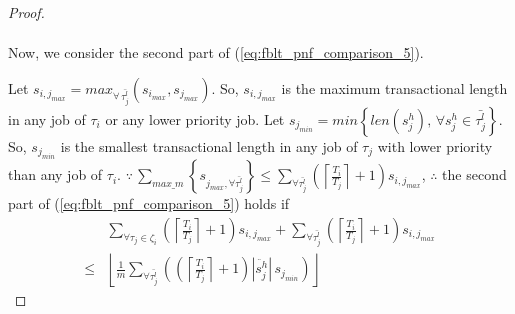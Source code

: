 \documentclass[conference,letterpaper]{IEEEtran}
\begin{document}
\begin{proof}
\begin{eqnarray}
\end{eqnarray}
%

%
Now, we consider the second part of (\ref{eq:fblt_pnf_comparison_5}). 
%

%
Let $s_{i,j_{max}}=max_{\forall\,\bar{\tau_{j}^{l}}}(s_{i_{max}},s_{j_{max}})$.
So, $s_{i,j_{max}}$ is the maximum transactional length in any job
of $\tau_{i}$ or any lower priority job. Let $s_{j_{min}}=min\left\{len(s_{j}^{h}),\,\forall s_{j}^{h}\in\bar{\tau_{j}^{l}}\right\}$.
So, $s_{j_{min}}$ is the smallest transactional length in any job
of $\tau_{j}$ with lower priority than any job of $\tau_{i}$. $\because\,\sum_{max\_m}\left\{ s_{j_{max},\forall\bar{\tau_{j}^{l}}}\right\} \le\sum_{\forall\bar{\tau_{j}^{l}}}\left(\left\lceil \frac{T_{i}}{T_{j}}\right\rceil +1\right)s_{i,j_{max}}$,
$\therefore$ the second part of (\ref{eq:fblt_pnf_comparison_5}) holds if 
\begin{eqnarray}
&\sum_{\forall\tau_{j}\in\zeta_{i}}\left(\left\lceil \frac{T_{i}}{T_{j}}\right\rceil +1\right)s_{i,j_{max}}+\sum_{\forall\bar{\tau_{j}^{l}}}\left(\left\lceil \frac{T_{i}}{T_{j}}\right\rceil +1\right)s_{i,j_{max}} \nonumber\\
\le & \left\lfloor \frac{1}{m}\sum_{\forall\bar{\tau_{j}^{l}}}\left(\left(\left\lceil \frac{T_{i}}{T_{j}}\right\rceil +1\right)|\ddot{s_{j}^{h}}|\, s_{j_{min}}\right)\right\rfloor \label{eq:fblt_pnf_comparison_10}
\end{eqnarray}

\end{proof}
\end{document}
